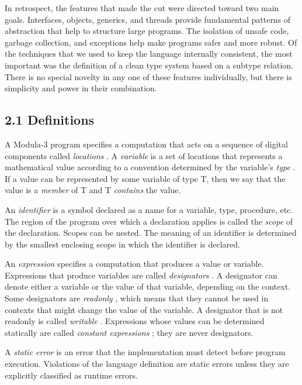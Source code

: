 \documentclass[10pt]{article}
\begin{document}
  In retrospect, the features that made the cut were directed toward two main goals. Interfaces, objects, generics, and threads provide fundamental patterns of abstraction that help to structure large programs. The isolation of unsafe code, garbage collection, and exceptions help make programs safer and more robust. Of the techniques that we used to keep the language internally consistent, the most important was the definition of a clean type system based on a subtype relation. There is no special novelty in any one of these features individually, but there is simplicity and power in their combination. 


 
\subsection*{2.1 Definitions}


 A Modula-3 program specifies a computation that acts on a sequence of digital components called \emph{locations}
. A \emph{variable}
 is a set of locations that represents a mathematical value according to a convention determined by the variable's \emph{type}
. If a value can be represented by some variable of type T, then we say that the value is a \emph{member}
 of T and T \emph{contains}
 the value. 


 An \emph{identifier}
 is a symbol declared as a name for a variable, type, procedure, etc. The region of the program over which a declaration applies is called the \emph{scope}
 of the declaration. Scopes can be nested. The meaning of an identifier is determined by the smallest enclosing scope in which the identifier is declared. 


 An \emph{expression}
 specifies a computation that produces a value or variable. Expressions that produce variables are called \emph{designators}
. A designator can denote either a variable or the value of that variable, depending on the context. Some designators are \emph{readonly}
, which means that they cannot be used in contexts that might change the value of the variable. A designator that is not readonly is called \emph{writable}
. Expressions whose values can be determined statically are called \emph{constant expressions}
; they are never designators. 


 A \emph{static error}
 is an error that the implementation must detect before program execution. Violations of the language definition are static errors unless they are explicitly classified as runtime errors. 
\end{document}
